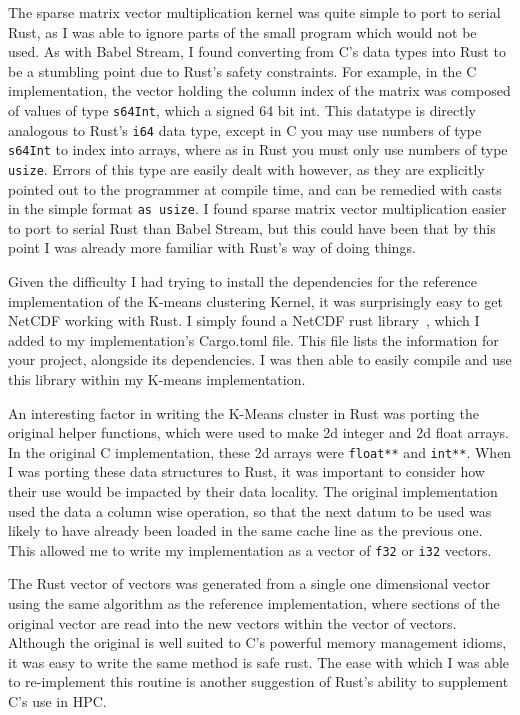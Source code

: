 The sparse matrix vector multiplication kernel was quite simple to port to serial Rust, as I was able to ignore parts of the small program which would not be used. As with Babel Stream, I found converting from C's data types into Rust to be a stumbling point due to Rust's safety constraints. For example, in the C implementation, the vector holding the column index of the matrix was composed of values of type \texttt{s64Int}, which a signed 64 bit int. This datatype is directly analogous to Rust's \texttt{i64} data type, except in C you may use numbers of type \texttt{s64Int} to index into arrays, where as in Rust you must only use numbers of type \texttt{usize}. Errors of this type are easily dealt with however, as they are explicitly pointed out to the programmer at compile time, and can be remedied with casts in the simple format \texttt{as usize}. I found sparse matrix vector multiplication easier to port to serial Rust than Babel Stream, but this could have been that by this point I was already more familiar with Rust's way of doing things.

Given the difficulty I had trying to install the dependencies for the reference implementation of the K-means clustering Kernel, it was surprisingly easy to get NetCDF working with Rust. I simply found a NetCDF rust library~\cite{RustNetCDF}, which I added to my implementation's Cargo.toml file. This file lists the information for your project, alongside its dependencies. I was then able to easily compile and use this library within my K-means implementation.

An interesting factor in writing the K-Means cluster in Rust was porting the original helper functions, which were used to make 2d integer and 2d float arrays. In the original C implementation, these 2d arrays were \texttt{float**} and \texttt{int**}. When I was porting these data structures to Rust, it was important to consider how their use would be impacted by their data locality. The original implementation used the data a column wise operation, so that the next datum to be used was likely to have already been loaded in the same cache line as the previous one. This allowed me to write my implementation as a vector of \texttt{f32} or \texttt{i32} vectors.

The Rust vector of vectors was generated from a single one dimensional vector using the same algorithm as the reference implementation, where sections of the original vector are read into the new vectors within the vector of vectors. Although the original is well suited to C's powerful memory management idioms, it was easy to write the same method is safe rust. The ease with which I was able to re-implement this routine is another suggestion of Rust's ability to supplement C's use in HPC.

